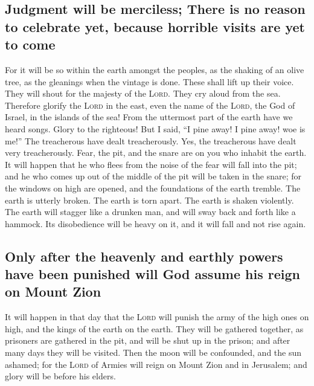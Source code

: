 \hypertarget{judgment-will-be-merciless-there-is-no-reason-to-celebrate-yet-because-horrible-visits-are-yet-to-come}{%
\subsection{Judgment will be merciless; There is no reason to celebrate
yet, because horrible visits are yet to
come}\label{judgment-will-be-merciless-there-is-no-reason-to-celebrate-yet-because-horrible-visits-are-yet-to-come}}

 For it will be so within the earth amongst the peoples,
as the shaking of an olive tree, as the gleanings when the vintage is
done.  These shall lift up their voice. They will shout
for the majesty of the \textsc{Lord}. They cry aloud from the sea.
 Therefore glorify the \textsc{Lord} in the east, even
the name of the \textsc{Lord}, the God of Israel, in the islands of the
sea!  From the uttermost part of the earth have we heard
songs. Glory to the righteous! But I said, ``I pine away! I pine away!
woe is me!'' The treacherous have dealt treacherously. Yes, the
treacherous have dealt very treacherously.  Fear, the
pit, and the snare are on you who inhabit the earth.  It
will happen that he who flees from the noise of the fear will fall into
the pit; and he who comes up out of the middle of the pit will be taken
in the snare; for the windows on high are opened, and the foundations of
the earth tremble.  The earth is utterly broken. The
earth is torn apart. The earth is shaken violently.  The
earth will stagger like a drunken man, and will sway back and forth like
a hammock. Its disobedience will be heavy on it, and it will fall and
not rise again.

\hypertarget{only-after-the-heavenly-and-earthly-powers-have-been-punished-will-god-assume-his-reign-on-mount-zion}{%
\subsection{Only after the heavenly and earthly powers have been
punished will God assume his reign on Mount
Zion}\label{only-after-the-heavenly-and-earthly-powers-have-been-punished-will-god-assume-his-reign-on-mount-zion}}

 It will happen in that day that the \textsc{Lord} will
punish the army of the high ones on high, and the kings of the earth on
the earth.  They will be gathered together, as prisoners
are gathered in the pit, and will be shut up in the prison; and after
many days they will be visited.  Then the moon will be
confounded, and the sun ashamed; for the \textsc{Lord} of Armies will
reign on Mount Zion and in Jerusalem; and glory will be before his
elders.

